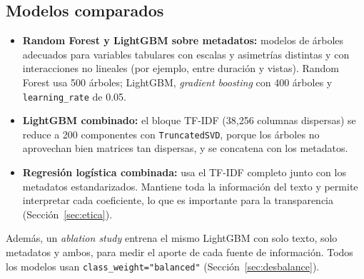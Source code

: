 \documentclass[conference]{IEEEtran}
\begin{document}
\subsection{Modelos comparados}\label{sec:modelos}
\begin{itemize}
\item \textbf{Random Forest y LightGBM sobre metadatos:} modelos de árboles adecuados para variables tabulares con escalas y asimetrías distintas y con interacciones no lineales (por ejemplo, entre duración y vistas). Random Forest usa 500 árboles; LightGBM, \textit{gradient boosting} con 400 árboles y \texttt{learning\_rate} de 0.05.
\item \textbf{LightGBM combinado:} el bloque TF-IDF (38,256 columnas dispersas) se reduce a 200 componentes con \texttt{TruncatedSVD}, porque los árboles no aprovechan bien matrices tan dispersas, y se concatena con los metadatos.
\item \textbf{Regresión logística combinada:} usa el TF-IDF completo junto con los metadatos estandarizados. Mantiene toda la información del texto y permite interpretar cada coeficiente, lo que es importante para la transparencia (Sección~\ref{sec:etica}).
\end{itemize}
Además, un \textit{ablation study} entrena el mismo LightGBM con solo texto, solo metadatos y ambos, para medir el aporte de cada fuente de información. Todos los modelos usan \texttt{class\_weight="balanced"} (Sección~\ref{sec:desbalance}).
\end{document}
